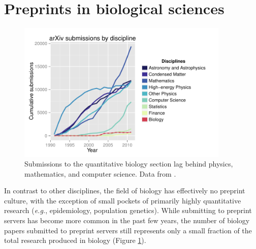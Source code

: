 \documentclass[letterpaper]{article}
\begin{document}
\section{Preprints in biological sciences}

\begin{figure}[ht!] \centering\includegraphics[width=0.90\textwidth]
{arxiv.pdf} \caption {Submissions to the quantitative biology section lag
behind physics, mathematics, and computer science. Data from \cite{war12}.}
\label{fig:arxiv} \end{figure}

In contrast to other disciplines, the field of biology has effectively no
preprint culture, with the exception of small pockets of primarily highly
quantitative research (\emph{e.g.}, epidemiology, population genetics).  While
submitting to preprint servers has become more common in the past few years, the
number of biology papers submitted to preprint servers still represents only a
small fraction of the total research produced in biology (Figure \ref{fig:arxiv}).
\end{document}
